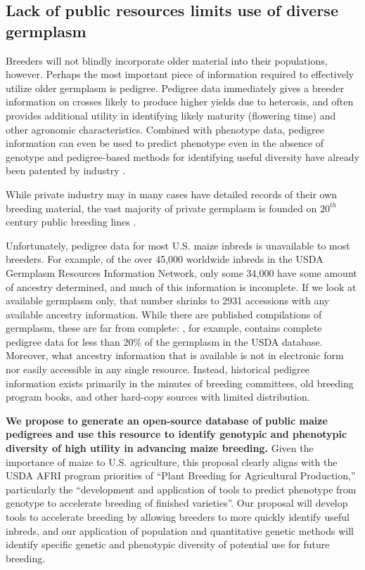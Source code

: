 \documentclass[final,12pt]{article}
\begin{document}
\subsection*{Lack of public resources limits use of diverse germplasm}

Breeders will not blindly incorporate older material into their populations, however.  
Perhaps the most important piece of information required to effectively utilize older germplasm is pedigree.
Pedigree data immediately gives a breeder information on crosses likely to produce higher yields due to heterosis, and often provides additional utility in identifying likely maturity (flowering time) and other agronomic characteristics. 
Combined with phenotype data, pedigree information can even be used to predict phenotype even in the absence of genotype \citep{piepho2008blup} and pedigree-based methods for identifying useful diversity have already been patented by industry \citep{sebastian1995method}.

While private industry may in many cases have detailed records of their own breeding material, the vast majority of private germplasm is founded on $20^{th}$ century public breeding lines \citep{nelson2008molecular}.

Unfortunately, pedigree data for most U.S. maize inbreds is unavailable to most breeders. 
For example, of the over 45,000 worldwide inbreds in the USDA Germplasm Resources Information Network, only some 34,000 have some amount of ancestry determined, and much of this information is incomplete.
If we look at available germplasm only, that number shrinks to 2931 accessions with any available ancestry information.
While there are published compilations of germplasm, these are far from complete:  \citet{gerdes1993compilation}, for example, contains complete pedigree data for less than 20\% of the germplasm in the USDA database.
Moreover, what ancestry information that is available is not in electronic form nor easily accessible in any single resource.  
Instead, historical pedigree information exists primarily in the minutes of breeding committees, old breeding program books, and other hard-copy sources with limited distribution.  

\textbf{We propose to generate an open-source database of public maize pedigrees and use this resource to identify genotypic and phenotypic diversity of high utility in advancing maize breeding.}
Given the importance of maize to U.S. agriculture, this proposal clearly aligns with the USDA AFRI program priorities of ``Plant Breeding for Agricultural Production,'' particularly the ``development and application of tools to predict phenotype from genotype to accelerate breeding of finished varieties''.   
Our proposal will develop tools to accelerate breeding by allowing breeders to more quickly identify useful inbreds, and our application of population and quantitative genetic methods will identify specific genetic and phenotypic diversity of potential use for future breeding.  
\end{document}
